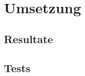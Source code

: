 \section{Umsetzung}\label{sec:umsetzung}

    \subsection{Resultate}

        
        
        
        

    \subsection{Tests}

        
        

    
    
